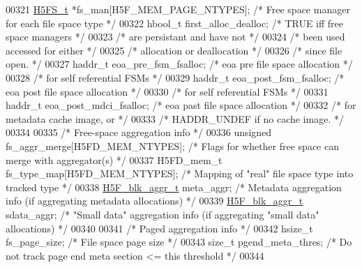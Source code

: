 \begin{DoxyCode}
00321     \hyperlink{struct_h5_f_s__t}{H5FS\_t} *fs\_man[H5F\_MEM\_PAGE\_NTYPES];            \textcolor{comment}{/* Free space manager for each file space type */}
00322     hbool\_t first\_alloc\_dealloc;            \textcolor{comment}{/* TRUE iff free space managers   */}
00323                                             \textcolor{comment}{/* are persistant and have not    */}
00324                                             \textcolor{comment}{/* been used accessed for either  */}
00325                                             \textcolor{comment}{/* allocation or deallocation     */}
00326                                             \textcolor{comment}{/* since file open.               */}
00327     haddr\_t eoa\_pre\_fsm\_fsalloc;        \textcolor{comment}{/* eoa pre file space allocation  */}
00328                                             \textcolor{comment}{/* for self referential FSMs      */}
00329     haddr\_t eoa\_post\_fsm\_fsalloc;           \textcolor{comment}{/* eoa post file space allocation */}
00330                                             \textcolor{comment}{/* for self referential FSMs      */}
00331     haddr\_t eoa\_post\_mdci\_fsalloc;          \textcolor{comment}{/* eoa past file space allocation */}
00332                                             \textcolor{comment}{/* for metadata cache image, or   */}
00333                                             \textcolor{comment}{/* HADDR\_UNDEF if no cache image. */}
00334 
00335     \textcolor{comment}{/* Free-space aggregation info */}
00336     \textcolor{keywordtype}{unsigned} fs\_aggr\_merge[H5FD\_MEM\_NTYPES];    \textcolor{comment}{/* Flags for whether free space can merge with
       aggregator(s) */}
00337     H5FD\_mem\_t fs\_type\_map[H5FD\_MEM\_NTYPES];    \textcolor{comment}{/* Mapping of "real" file space type into tracked type */}
00338     \hyperlink{struct_h5_f__blk__aggr__t}{H5F\_blk\_aggr\_t} meta\_aggr;             \textcolor{comment}{/* Metadata aggregation info (if aggregating
       metadata allocations) */}
00339     \hyperlink{struct_h5_f__blk__aggr__t}{H5F\_blk\_aggr\_t} sdata\_aggr;                  \textcolor{comment}{/* "Small data" aggregation info (if
       aggregating "small data" allocations) */}
00340 
00341     \textcolor{comment}{/* Paged aggregation info */}
00342     hsize\_t fs\_page\_size;                           \textcolor{comment}{/* File space page size */}
00343     \textcolor{keywordtype}{size\_t} pgend\_meta\_thres;                        \textcolor{comment}{/* Do not track page end meta section <= this threshold
       */}
00344 

\end{DoxyCode}
